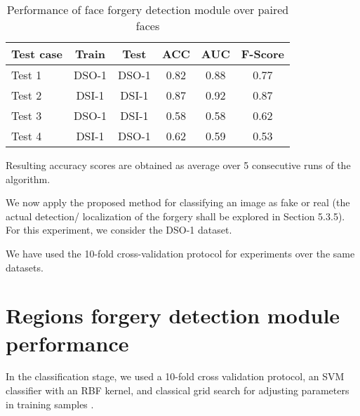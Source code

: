 \begin{table}[h!]
\centering
\begin{tabular}{l c c c c c} 
\hline \hline 
\textbf{Test case} & \textbf{Train} & \textbf{Test} & \textbf{ACC} & \textbf{AUC} &\textbf{ F-Score} \\ [0.5ex]
\hline
Test 1 & DSO-1 & DSO-1 &	0.82 & 0.88	& 0.77\\
Test 2 & DSI-1 & DSI-1 &	0.87 & 0.92 & 0.87\\
Test 3 &	DSO-1 &	DSI-1 &	0.58 & 0.58 & 0.62\\
Test 4 &	DSI-1 & DSO-1 & 0.62 & 0.59 & 0.53\\ [1ex]
\hline
\end{tabular}
\caption{Performance of face forgery detection module over paired faces}
\label{table:performancefacedet}
\end{table}

Resulting accuracy scores are obtained as average over 5 consecutive runs of the algorithm.




We now apply the proposed method for classifying an image as fake or real (the actual detection/
localization of the forgery shall be explored in Section 5.3.5). For this experiment,
we consider the DSO-1 dataset.



We have used the 10-fold cross-validation protocol for experiments over the same datasets.


\section{Regions forgery detection module performance}


In the classification stage, we used a 10-fold cross validation protocol, an SVM classifier with an RBF
kernel, and classical grid search for adjusting parameters in training samples \cite{bishop2007pattern}.



